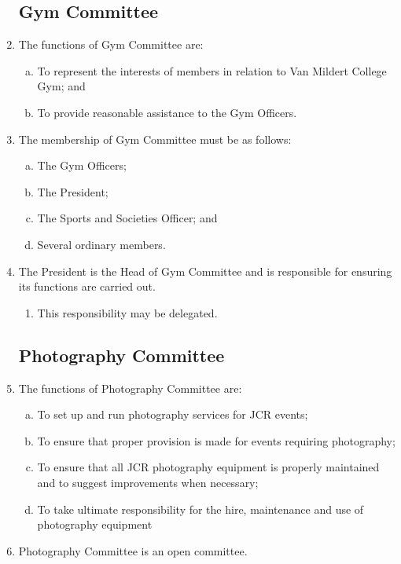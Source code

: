 \documentclass[12pt]{article}
\begin{document}
\begin{enumerate}
    \subsection{Gym Committee}
    \item The functions of Gym Committee are:
    \begin{enumerate}[(a)]
        \item To represent the interests of members in relation to Van Mildert College Gym; and
        \item To provide reasonable assistance to the Gym Officers.
    \end{enumerate}
    \item The membership of Gym Committee must be as follows:
    \begin{enumerate}[(a)]
        \item The Gym Officers;
        \item The President;
        \item The Sports and Societies Officer; and
        \item Several ordinary members.
    \end{enumerate}
    \item The President is the Head of Gym Committee and is responsible for ensuring its functions are carried out.
    \begin{enumerate}
        \item This responsibility may be delegated.
    \end{enumerate}
    \subsection{Photography Committee}
    \item The functions of Photography Committee are:
    \begin{enumerate}[(a)]
        \item To set up and run photography services for JCR events;
        \item To ensure that proper provision is made for events requiring photography;
        \item To ensure that all JCR photography equipment is properly maintained and to suggest improvements when necessary;
        \item To take ultimate responsibility for the hire, maintenance and use of photography equipment
    \end{enumerate}
    \item Photography Committee is an open committee.

\end{enumerate}
\end{document}
